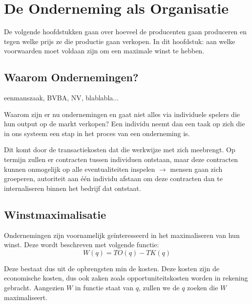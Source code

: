 \section{De Onderneming als Organisatie}
De volgende hoofdstukken gaan over hoeveel de producenten gaan produceren en tegen welke prijs ze die productie gaan verkopen. In dit hoofdstuk: aan welke voorwaarden moet voldaan zijn om een maximale winst te hebben.

\subsection{Waarom Ondernemingen?}
eenmanszaak, BVBA, NV, blablabla...

Waarom zijn er nu ondernemingen en gaat niet alles via individuele spelers die hun output op de markt verkopen? Een individu neemt dan een taak op zich die in ons systeem een stap in het proces van een onderneming is.

Dit komt door de transactiekosten dat die werkwijze met zich meebrengt. Op termijn zullen er contracten tussen individuen ontstaan, maar deze contracten kunnen onmogelijk op alle eventualiteiten inspelen $\rightarrow$ mensen gaan zich groeperen, autoriteit aan \'e\'en individu afstaan om deze contracten dan te internaliseren binnen het bedrijf dat ontstaat.

\subsection{Winstmaximalisatie}
Ondernemingen zijn voornamelijk ge\"interesseerd in het maximaliseren van hun winst. Deze wordt beschreven met volgende functie:
\begin{equation}
	W(q) = TO(q) - TK(q)
\end{equation}

Deze bestaat dus uit de opbrengsten min de kosten. Deze kosten zijn de economische kosten, dus ook zaken zoals opportuniteitskosten worden in rekening gebracht. Aangezien $W$ in functie staat van $q$, zullen we de $q$ zoeken die $W$ maximaliseert. 

